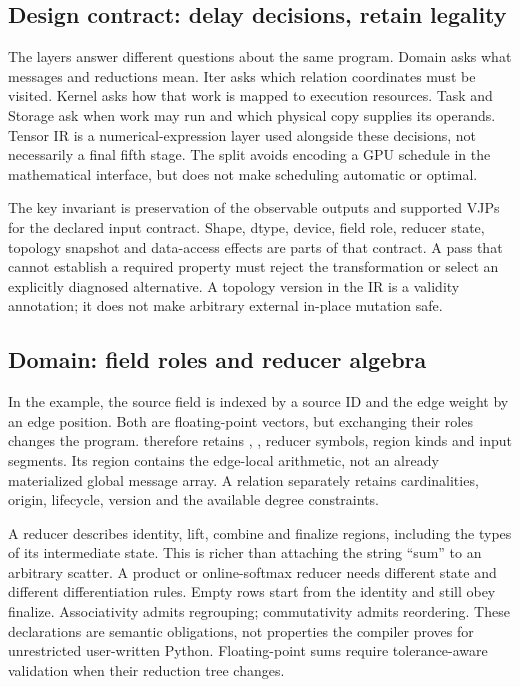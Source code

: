 \subsection{Design contract: delay decisions, retain legality}
\label{sec:ir-design}
The layers answer different questions about the same program. Domain asks what
messages and reductions mean. Iter asks which relation coordinates must be
visited. Kernel asks how that work is mapped to execution resources. Task and
Storage ask when work may run and which physical copy supplies its operands.
Tensor IR is a numerical-expression layer used alongside these decisions, not
necessarily a final fifth stage. The split avoids encoding a GPU schedule in
the mathematical interface, but does not make scheduling automatic or optimal.

The key invariant is preservation of the observable outputs and supported VJPs
for the declared input contract. Shape, dtype, device, field role, reducer state,
topology snapshot and data-access effects are parts of that contract. A pass
that cannot establish a required property must reject the transformation or
select an explicitly diagnosed alternative. A topology version in the IR is a
validity annotation; it does not make arbitrary external in-place mutation safe.

\subsection{Domain: field roles and reducer algebra}
In the example, the source field is indexed by a source ID and the edge weight
by an edge position. Both are floating-point vectors, but exchanging their roles
changes the program.  therefore retains ,
, reducer symbols, region kinds and input segments. Its region
contains the edge-local arithmetic, not an already materialized global message
array. A relation separately retains cardinalities, origin, lifecycle, version
and the available degree constraints.

A reducer describes identity, lift, combine and finalize regions, including the
types of its intermediate state. This is richer than attaching the string
``sum'' to an arbitrary scatter. A product or online-softmax reducer needs
different state and different differentiation rules. Empty rows start from the
identity and still obey finalize. Associativity admits regrouping; commutativity
admits reordering. These declarations are semantic obligations, not properties
the compiler proves for unrestricted user-written Python. Floating-point sums
require tolerance-aware validation when their reduction tree changes.

